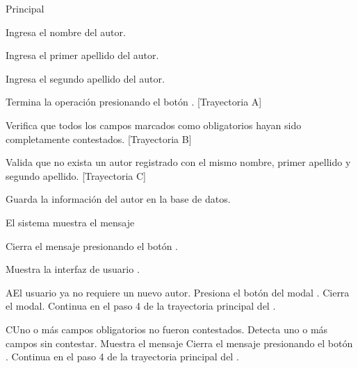 \begin{UCtrayectoria}{Principal}

    \UCpaso[\UCactor] Ingresa el nombre del autor.

    \UCpaso[\UCactor] Ingresa el primer apellido del autor.

    \UCpaso[\UCactor] Ingresa el segundo apellido del autor.

    \UCpaso[\UCactor] Termina la operación presionando el botón . [Trayectoria A]

    \UCpaso Verifica que todos los campos marcados como obligatorios hayan sido completamente contestados. [Trayectoria B]

    \UCpaso Valida que no exista un autor registrado con el mismo nombre, primer apellido y segundo apellido. [Trayectoria C]

    \UCpaso Guarda la información del autor en la base de datos.

    \UCpaso El sistema muestra el mensaje 

    \UCpaso[\UCactor] Cierra el mensaje presionando el botón .

    \UCpaso Muestra la interfaz de usuario .
\end{UCtrayectoria}


\begin{UCtrayectoriaA}{A}{El usuario ya no requiere un nuevo autor.}
    \UCpaso[\UCactor] Presiona el botón \IUbutton{$\bigotimes$} del modal .
    \UCpaso Cierra el modal.
    \UCpaso Continua en el paso 4 de la trayectoria principal del .
\end{UCtrayectoriaA}



\begin{UCtrayectoriaA}{C}{Uno o más campos obligatorios no fueron contestados.}
    \UCpaso Detecta uno o más campos sin contestar.
    \UCpaso Muestra el mensaje 
    \UCpaso[\UCactor] Cierra el mensaje presionando el botón .
    \UCpaso Continua en el paso 4 de la trayectoria principal del .
\end{UCtrayectoriaA}

